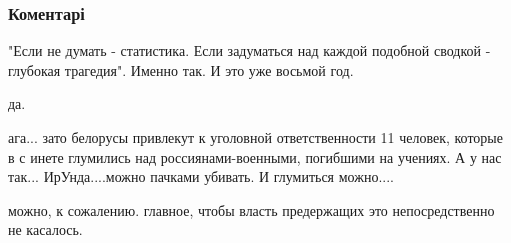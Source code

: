  
 
 
 
 
\subsubsection{Коментарі}
\label{sec:01_12_2021.fb.toporov_aleksej.1.svodki_vojna.cmt}

\begin{itemize} %

"Если не думать - статистика. Если задуматься над каждой подобной сводкой -
глубокая трагедия". Именно так. И это уже восьмой год.

да.


ага... зато белорусы привлекут к уголовной ответственности 11 человек, которые
в с инете глумились над россиянами-военными, погибшими на учениях. А у нас
так... ИрУнда....можно пачками убивать. И глумиться можно....

можно, к сожалению. главное, чтобы власть предержащих это непосредственно не касалось.
\end{itemize} %
